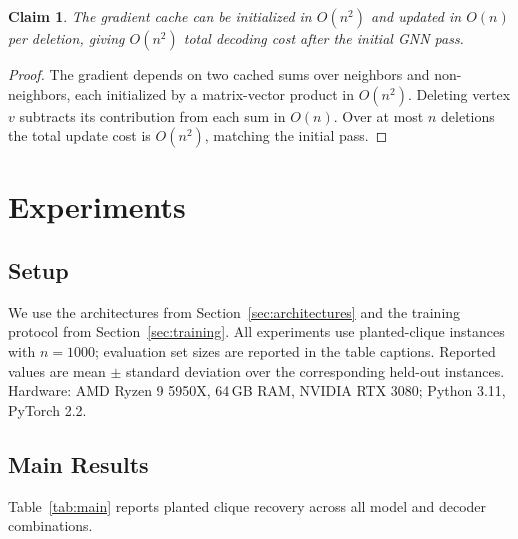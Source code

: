 \documentclass[journal,article,submit,pdftex,moreauthors]{Definitions/mdpi}
\newtheorem{claim}{Claim}[section]
\begin{document}
\begin{claim}
  The gradient cache can be initialized in $O(n^2)$ and updated in $O(n)$ per
  deletion, giving $O(n^2)$ total decoding cost after the initial GNN pass.
\end{claim}
\begin{proof}
  The gradient depends on two cached sums over neighbors and non-neighbors, each
  initialized by a matrix-vector product in $O(n^2)$. Deleting vertex $v$ subtracts
  its contribution from each sum in $O(n)$. Over at most $n$ deletions the total
  update cost is $O(n^2)$, matching the initial pass.
\end{proof}

\section{Experiments}
\label{sec:experiments}

\subsection{Setup}

We use the architectures from Section~\ref{sec:architectures} and the training
protocol from Section~\ref{sec:training}. All experiments use planted-clique
instances with $n=1000$; evaluation set sizes are reported in the table captions.
Reported values are mean $\pm$ standard deviation over the corresponding held-out
instances. Hardware: AMD Ryzen 9 5950X, 64\,GB RAM, NVIDIA RTX 3080; Python 3.11,
PyTorch 2.2.

\subsection{Main Results}
\label{sec:main_results}

Table~\ref{tab:main} reports planted clique recovery across all model and decoder
combinations.
\end{document}

